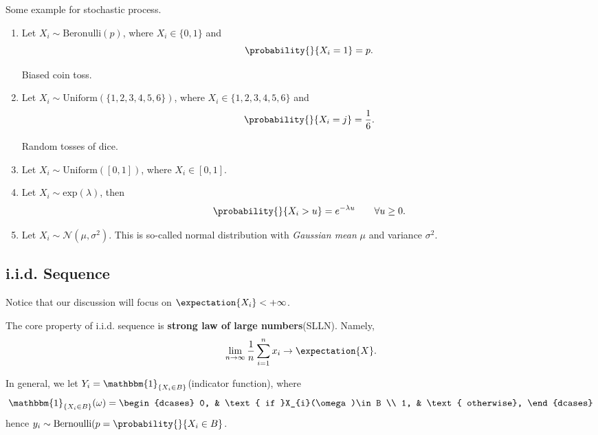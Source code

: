 \begin{eg}
	Some example for stochastic process.
	\begin{enumerate}
		\item Let \(X_i\sim \mathrm{Beronulli}(p)\), where \(X_{i}\in\{0, 1\}\) and
		      \[
			      \probability{}{X_{i} = 1} = p.
		      \]
		      \begin{intuition}
			      Biased coin toss.
		      \end{intuition}
		\item Let \(X_i\sim \mathrm{Uniform}(\{1, 2, 3, 4, 5, 6\})\), where \(X_{i}\in\{1, 2, 3, 4, 5, 6\}\) and
		      \[
			      \probability{}{X_{i} = j} = \frac{1}{6}.
		      \]
		      \begin{intuition}
			      Random tosses of dice.
		      \end{intuition}
		\item Let \(X_i\sim \mathrm{Uniform}(\left[ 0, 1 \right] )\), where \(X_{i}\in\left[ 0, 1 \right] \).
		\item Let \(X_i\sim \mathrm{exp}(\lambda)\), then
		      \[
			      \probability{}{X_{i}>u} = e^{-\lambda u}\qquad \forall u\geq 0.
		      \]
		\item Let \(X_i\sim \mathcal{N}(\mu, \sigma^2)\). This is so-called normal distribution with \emph{Gaussian mean} \(\mu\) and variance \(\sigma^2\).
	\end{enumerate}
\end{eg}

\subsection{i.i.d. Sequence}
\begin{remark}
	Notice that our discussion will focus on \(\expectation{X_i} < +\infty \).
\end{remark}

\begin{note}
	The core property of i.i.d. sequence is \textbf{strong law of large numbers}(SLLN). Namely,
	\[
		\lim_{n \to \infty} \frac{1}{n}\sum\limits_{i=1}^{n} x_{i}\to \expectation{X}.
	\]
\end{note}

In general, we let \(Y_{i} = \mathbbm{1}_{\{X_{i}\in B\}}\)(indicator function), where
\[
	\mathbbm{1}_{\{X_{i}\in B\}}(\omega) = \begin{dcases}
		0, & \text{ if }X_{i}(\omega)\in B \\
		1, & \text{ otherwise},
	\end{dcases}
\]
hence \(y_{i}\sim \mathrm{Bernoulli}(p = \probability{}{X_{i}\in B}\).

